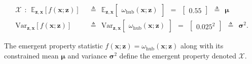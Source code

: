 \documentclass[11pt]{article}
\begin{document}
\begin{equation}\label{eq:EP_STG}
\begin{split}
\mathcal{X} ~~:~~ \mathbb{E}_{\mathbf{z},\mathbf{x}}\left[f(\mathbf{x}; \mathbf{z})\right] &~~\triangleq~~  \mathbb{E}_{\mathbf{z},\mathbf{x}}\begin{bmatrix} \omega_{\text{hub}}(\mathbf{x}; \mathbf{z}) \end{bmatrix}  ~~=~~  \begin{bmatrix} 0.55 \end{bmatrix} ~~\triangleq~~ \bm{\mu}  \\ 
 \text{Var}_{\mathbf{z},\mathbf{x}}\left[f(\mathbf{x}; \mathbf{z})\right] &~~\triangleq~~ \text{Var}_{\mathbf{z},\mathbf{x}}\begin{bmatrix} \omega_{\text{hub}}(\mathbf{x}; \mathbf{z}) \end{bmatrix}  ~~=~~  \begin{bmatrix} 0.025^2 \end{bmatrix} ~~\triangleq~~ \bm{\sigma}^2 .
\end{split}
\end{equation}

The emergent property statistic $f(\mathbf{x}; \mathbf{z}) = \omega_{\text{hub}}(\mathbf{x}; \mathbf{z})$ along with its constrained mean $\bm{\mu}$ and variance $\bm{\sigma}^2$ define the emergent property denoted $\mathcal{X}$.
\end{document}
